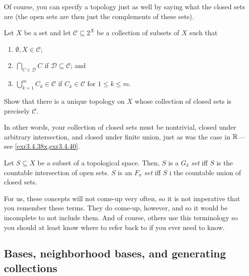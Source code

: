 Of course, you can specify a topology just as well by saying what the closed sets are (the open sets are then just the complements of these sets).
\begin{exr}\label{exr4.1.2}
Let $X$ be a set and let $\mathcal{C}\subseteq 2^X$ be a collection of subsets of $X$ such that
\begin{enumerate}
\item $\emptyset ,X\in \mathcal{C}$;
\item $\bigcap _{C\in \mathcal{D}}C$ if $\mathcal{D}\subseteq \mathcal{C}$; and
\item $\bigcup _{k=1}^mC_k\in \mathcal{C}$ if $C_k\in \mathcal{C}$ for $1\leq k\leq m$.
\end{enumerate}
Show that there is a unique topology on $X$ whose collection of closed sets is precisely $\mathcal{C}$.
\begin{rmk}
In other words, your collection of closed sets must be nontrivial, closed under arbitrary intersection, and closed under finite union, just as was the case in $\mathbb{R}$---see \cref{exr3.4.38x,exr3.4.40}.
\end{rmk}
\end{exr}
\begin{dfn}\label{GDeltaFSigma}
Let $S\subseteq X$ be a subset of a topological space.  Then, $S$ is a \emph{$G_\delta$ set} iff $S$ is the countable intersection of open sets.  $S$ is an \emph{$F_\sigma$ set} iff $S$ i the countable union of closed sets.
\begin{rmk}
For us, these concepts will not come-up very often, so it is not imperative that you remember these terms.  They do come-up, however, and so it would be incomplete to not include them.  And of course, others use this terminology so you should at least know where to refer back to if you ever need to know.
\end{rmk}
\end{dfn}

\subsection{Bases, neighborhood bases, and generating collections}


